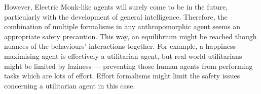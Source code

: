 However, Electric Monk-like agents will surely come to be in the future, particularly with the development of general intelligence. Therefore, the combination of multiple formalisms in any anthropomorphic agent seems an appropriate safety precaution. This way, an equilibrium might be reached though nuances of the behaviours' interactions together. For example, a happiness-maximising agent is effectively a utilitarian agent, but real-world utilitarians might be limited by laziness --- preventing those human agents from performing tasks which are lots of effort. Effort formalisms might limit the safety issues concerning a utilitarian agent in this case. \par
